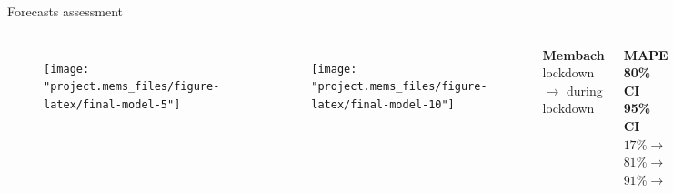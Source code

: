 \documentclass{beamer}
\begin{document}
\begin{frame}{Forecasts assessment}
	\begin{columns}[c]
		\begin{figure}
			\texttt{[image: "project.mems\_files/figure-latex/final-model-5"]}
		\end{figure}
		\begin{figure}
			\texttt{[image: "project.mems\_files/figure-latex/final-model-10"]}
		\end{figure}
		\centering
		\textbf{Membach}\\
		lockdown $\rightarrow$ during lockdown\\~\\
		\begin{columns}[T]
			\raggedleft
			\textbf{MAPE}\\\textbf{80\% CI}\\\textbf{95\% CI}\\
			\raggedleft
			$17\% \rightarrow$\\
			$81\% \rightarrow$\\
			$91\% \rightarrow$\\
			\raggedright
			${14\%}$\\
			${82\%}$\\
			${96\%}$\\
		\end{columns}~\\
		$\Downarrow$\\
		Slight performance improvement\\
		\textit{lower peaks}
	\end{columns}
\end{frame}
\end{document}
